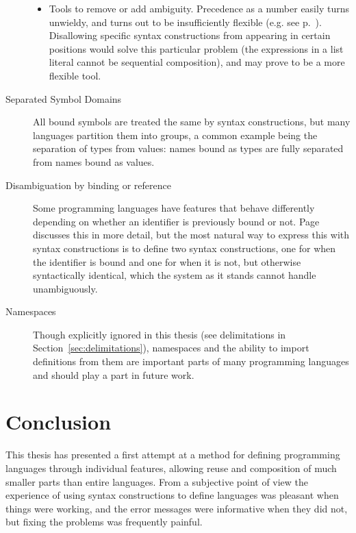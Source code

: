 \documentclass{kththesis}
\begin{document}
\begin{description}
\begin{itemize}
    \item Tools to remove or add ambiguity. Precedence as a number easily turns unwieldy, and turns out to be insufficiently flexible (e.g. see p.~\pageref{sec:ambiguous-lists}). Disallowing specific syntax constructions from appearing in certain positions would solve this particular problem (the expressions in a list literal cannot be sequential composition), and may prove to be a more flexible tool.
  \end{itemize}

  \item[Separated Symbol Domains] All bound symbols are treated the same by syntax constructions, but many languages partition them into groups, a common example being the separation of types from values: names bound as types are fully separated from names bound as values. %

  \item[Disambiguation by binding or reference] Some programming languages have features that behave differently depending on whether an identifier is previously bound or not. Page~\pageref{sec:prolog-pattern-matching} discusses this in more detail, but the most natural way to express this with syntax constructions is to define two syntax constructions, one for when the identifier is bound and one for when it is not, but otherwise syntactically identical, which the system as it stands cannot handle unambiguously.

  \item[Namespaces] Though explicitly ignored in this thesis (see delimitations in Section~\ref{sec:delimitations}), namespaces and the ability to import definitions from them are important parts of many programming languages and should play a part in future work.
\end{description}

\section{Conclusion}

This thesis has presented a first attempt at a method for defining programming languages through individual features, allowing reuse and composition of much smaller parts than entire languages. From a subjective point of view the experience of using syntax constructions to define languages was pleasant when things were working, and the error messages were informative when they did not, but fixing the problems was frequently painful.
\end{document}
